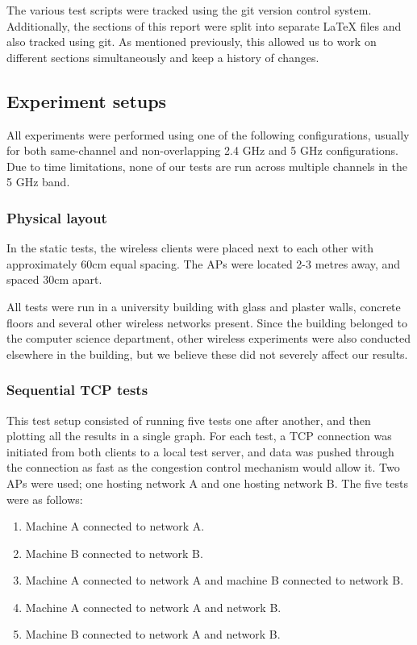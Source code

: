 The various test scripts were tracked using the git version control
system. Additionally, the sections of this report were split into separate
LaTeX files and also tracked using git. As mentioned previously, this allowed
us to work on different sections simultaneously and keep a history of changes.

\subsection{Experiment setups}
\label{sec:met:setups}
All experiments were performed using one of the following configurations,
usually for both same-channel and non-overlapping 2.4 GHz and 5 GHz
configurations. Due to time limitations, none of our tests are run across
multiple channels in the 5 GHz band.

\subsubsection{Physical layout}
In the static tests, the wireless clients were placed next to each other with
approximately 60cm equal spacing. The APs were located 2-3 metres away, and
spaced 30cm apart.

All tests were run in a university building with glass and plaster walls,
concrete floors and several other wireless networks present. Since the building
belonged to the computer science department, other wireless experiments were
also conducted elsewhere in the building, but we believe these did not severely
affect our results.

\subsubsection{Sequential TCP tests}
\label{sec:met:setups:seqtcp}
This test setup consisted of running five tests one after another, and then
plotting all the results in a single graph. For each test, a TCP connection was
initiated from both clients to a local test server, and data was pushed through
the connection as fast as the congestion control mechanism would allow it. Two
APs were used; one hosting network A and one hosting network B. The five tests
were as follows:

\begin{enumerate}
  \item Machine A connected to network A.
  \item Machine B connected to network B.
  \item Machine A connected to network A and machine B connected to network B.
  \item Machine A connected to network A and network B.
  \item Machine B connected to network A and network B.
\end{enumerate}

